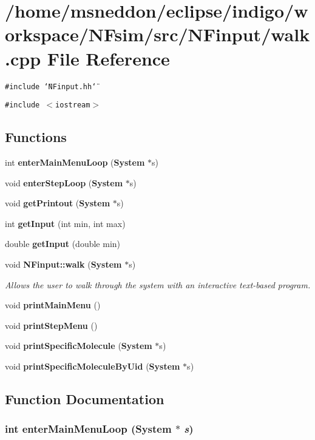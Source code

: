 \section{/home/msneddon/eclipse/indigo/workspace/NFsim/src/NFinput/walk.cpp File Reference}
\label{walk_8cpp}


{\tt \#include \char`\"{}NFinput.hh\char`\"{}}\par
{\tt \#include $<$iostream$>$}\par
\subsection*{Functions}
\begin{CompactItemize}
\item 
int {\bf enterMainMenuLoop} ({\bf System} $\ast$s)
\item 
void {\bf enterStepLoop} ({\bf System} $\ast$s)
\item 
void {\bf getPrintout} ({\bf System} $\ast$s)
\item 
int {\bf getInput} (int min, int max)
\item 
double {\bf getInput} (double min)
\item 
void {\bf NFinput::walk} ({\bf System} $\ast$s)
\begin{CompactList}\small\item\em Allows the user to walk through the system with an interactive text-based program. \item\end{CompactList}\item 
void {\bf printMainMenu} ()
\item 
void {\bf printStepMenu} ()
\item 
void {\bf printSpecificMolecule} ({\bf System} $\ast$s)
\item 
void {\bf printSpecificMoleculeByUid} ({\bf System} $\ast$s)
\end{CompactItemize}


\subsection{Function Documentation}
\subsubsection{\setlength{\rightskip}{0pt plus 5cm}int enterMainMenuLoop ({\bf System} $\ast$ {\em s})}\label{walk_8cpp_863793acef9098334f0848f1248f1751}


